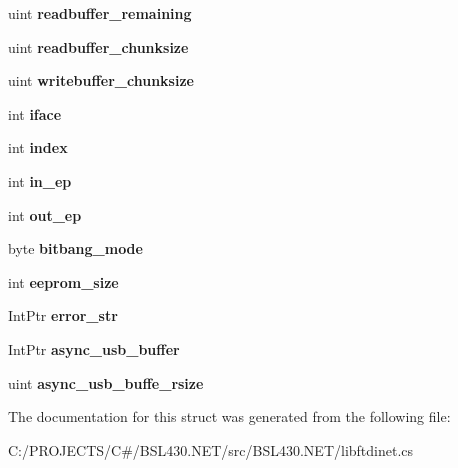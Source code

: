 \begin{DoxyCompactItemize}
\item 
\mbox{\label{structlibftdinet_1_1ftdi__context_aef2474027449aa18bdfa35541fe20480}} 
uint {\bfseries readbuffer\+\_\+remaining}
\item 
\mbox{\label{structlibftdinet_1_1ftdi__context_aa04a2c2201eda18a019d8c9246b92934}} 
uint {\bfseries readbuffer\+\_\+chunksize}
\item 
\mbox{\label{structlibftdinet_1_1ftdi__context_ab98c5c0c0f7d59c8b151e740dea242da}} 
uint {\bfseries writebuffer\+\_\+chunksize}
\item 
\mbox{\label{structlibftdinet_1_1ftdi__context_a0e2d7332a9d2ad5bf1410a78be51ceba}} 
int {\bfseries iface}
\item 
\mbox{\label{structlibftdinet_1_1ftdi__context_a013de0c84b23cf057518cacfe8259816}} 
int {\bfseries index}
\item 
\mbox{\label{structlibftdinet_1_1ftdi__context_ac421898174b5540cc7f2b3f16b530863}} 
int {\bfseries in\+\_\+ep}
\item 
\mbox{\label{structlibftdinet_1_1ftdi__context_a54bebbf6c8bb7eec18e59022c0bb30dc}} 
int {\bfseries out\+\_\+ep}
\item 
\mbox{\label{structlibftdinet_1_1ftdi__context_a4d6d84ce409fef5f74f52f78958f00c4}} 
byte {\bfseries bitbang\+\_\+mode}
\item 
\mbox{\label{structlibftdinet_1_1ftdi__context_ac0b704ada8e38f0c0a578ed0ea9a3795}} 
int {\bfseries eeprom\+\_\+size}
\item 
\mbox{\label{structlibftdinet_1_1ftdi__context_a7a4ff0d7c57e9d1b7a4018fc560195df}} 
Int\+Ptr {\bfseries error\+\_\+str}
\item 
\mbox{\label{structlibftdinet_1_1ftdi__context_a7f09b9e81f03215a84ce7a1875244772}} 
Int\+Ptr {\bfseries async\+\_\+usb\+\_\+buffer}
\item 
\mbox{\label{structlibftdinet_1_1ftdi__context_abb478be6b27e335cbac816bbac64164b}} 
uint {\bfseries async\+\_\+usb\+\_\+buffe\+\_\+rsize}
\end{DoxyCompactItemize}


The documentation for this struct was generated from the following file\+:\begin{DoxyCompactItemize}
\item 
C\+:/\+P\+R\+O\+J\+E\+C\+T\+S/\+C\#/\+B\+S\+L430.\+N\+E\+T/src/\+B\+S\+L430.\+N\+E\+T/libftdinet.\+cs\end{DoxyCompactItemize}
